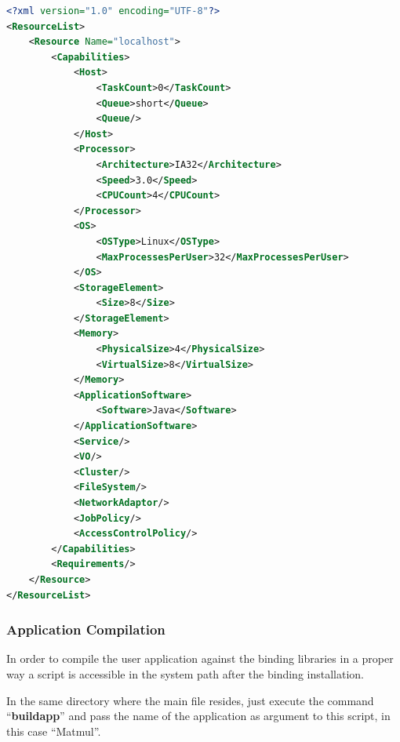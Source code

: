 \begin{lstlisting}[language=xml] 
<?xml version="1.0" encoding="UTF-8"?>
<ResourceList>
    <Resource Name="localhost">
        <Capabilities>
            <Host>
                <TaskCount>0</TaskCount>
                <Queue>short</Queue>
                <Queue/>
            </Host>
            <Processor>
                <Architecture>IA32</Architecture>
                <Speed>3.0</Speed>
                <CPUCount>4</CPUCount>
            </Processor>
            <OS>
                <OSType>Linux</OSType>
                <MaxProcessesPerUser>32</MaxProcessesPerUser>
            </OS>
            <StorageElement>
                <Size>8</Size>
            </StorageElement>
            <Memory>
                <PhysicalSize>4</PhysicalSize>
                <VirtualSize>8</VirtualSize>
            </Memory>
            <ApplicationSoftware>
                <Software>Java</Software>
            </ApplicationSoftware>
            <Service/>
            <VO/>
            <Cluster/>
            <FileSystem/>
            <NetworkAdaptor/>
            <JobPolicy/>
            <AccessControlPolicy/>
        </Capabilities>
        <Requirements/>
    </Resource>
</ResourceList>
\end{lstlisting}

\subsubsection{Application Compilation}
  In order to compile the user application against the binding libraries in a proper way a script is accessible in the system path after the binding installation.

In the same directory where the main file resides, just execute the command ``{\bf buildapp}'' and pass the name of the application as argument to this script, in this case ``Matmul''.

